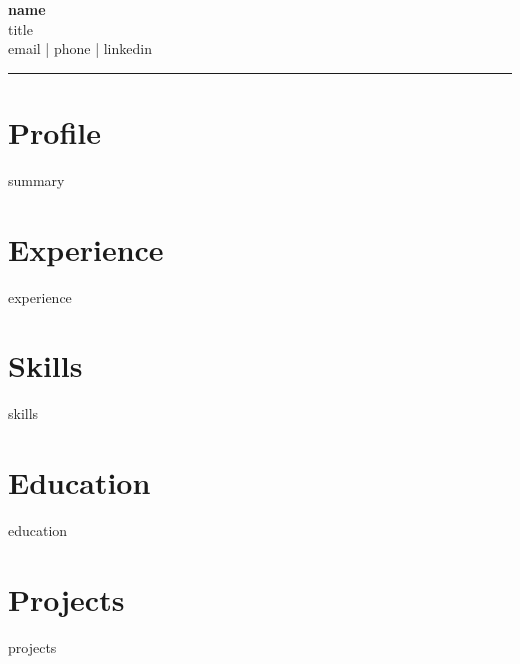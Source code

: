 \documentclass[11pt]{article}
\begin{document}
\pagestyle{empty}

\begin{center}
  {\LARGE\bfseries {name}}\\
  {\small\color{subheading} {title} \\ {email} | {phone} | {linkedin}}\\[6pt]
  \noindent\rule{0.9\linewidth}{0.4pt}
\end{center}

\section*{Profile}
{summary}

\section*{Experience}
{experience}

\section*{Skills}
{skills}

\section*{Education}
{education}

\section*{Projects}
{projects}
\end{document}
